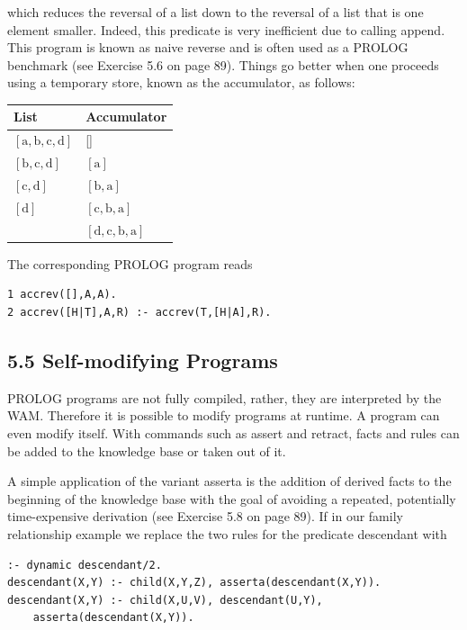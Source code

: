 \documentclass[10pt]{book}
\begin{document}
\begin{center}
which reduces the reversal of a list down to the reversal of a list that is one element smaller. Indeed, this predicate is very inefficient due to calling append. This program is known as naive reverse and is often used as a PROLOG benchmark (see Exercise 5.6 on page 89). Things go better when one proceeds using a temporary store, known as the accumulator, as follows:

\begin{center}
\begin{tabular}{ll}
\hline
List & Accumulator \\
\hline
$[\mathrm{a}, \mathrm{b}, \mathrm{c}, \mathrm{d}]$ & [] \\
\hline
$[\mathrm{b}, \mathrm{c}, \mathrm{d}]$ & $[\mathrm{a}]$ \\
\hline
$[\mathrm{c}, \mathrm{d}]$ & $[\mathrm{b}, \mathrm{a}]$ \\
\hline
$[\mathrm{d}]$ & $[\mathrm{c}, \mathrm{b}, \mathrm{a}]$ \\
\hline
[] & $[\mathrm{d}, \mathrm{c}, \mathrm{b}, \mathrm{a}]$ \\
\hline
\end{tabular}
\end{center}

The corresponding PROLOG program reads

\begin{verbatim}
1 accrev([],A,A).
2 accrev([H|T],A,R) :- accrev(T,[H|A],R).
\end{verbatim}

\subsection*{5.5 Self-modifying Programs}
PROLOG programs are not fully compiled, rather, they are interpreted by the WAM. Therefore it is possible to modify programs at runtime. A program can even modify itself. With commands such as assert and retract, facts and rules can be added to the knowledge base or taken out of it.

A simple application of the variant asserta is the addition of derived facts to the beginning of the knowledge base with the goal of avoiding a repeated, potentially time-expensive derivation (see Exercise 5.8 on page 89). If in our family relationship example we replace the two rules for the predicate descendant with

\begin{verbatim}
:- dynamic descendant/2.
descendant(X,Y) :- child(X,Y,Z), asserta(descendant(X,Y)).
descendant(X,Y) :- child(X,U,V), descendant(U,Y),
    asserta(descendant(X,Y)).
\end{verbatim}


\end{center}
\end{document}
